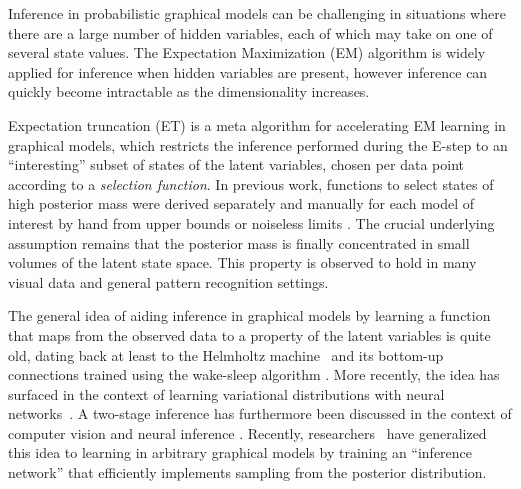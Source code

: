 Inference in probabilistic graphical models can be challenging in situations where
there are a large number of hidden variables, each of which may take on one of several
state values. The Expectation Maximization (EM) algorithm is widely applied for inference when hidden variables
are present, however inference can quickly become intractable as the dimensionality increases.

Expectation truncation (ET) \citep{LuckeEggert2010} is a meta algorithm for accelerating EM learning
in graphical models, which restricts the inference performed during the E-step
to an ``interesting'' subset of states of the latent variables,  %
chosen per data point according to a \emph{selection function}.
In previous work, functions to select states of high posterior mass were 
derived separately and manually for each model of interest by hand from upper bounds or noiseless limits 
\citep{LuckeEggert2010,SheltonEtAl2012,BornscheinEtAl2013,SheikhEtAl2014}.
The crucial underlying assumption remains that the posterior mass is finally concentrated in small volumes of the latent state space.
This property is observed to hold in many visual data and general pattern recognition settings.

The general idea of aiding inference in graphical models by
learning a function that maps from the observed data to
a property of the latent variables is quite old, dating back at least to the
Helmholtz machine~\cite{Dayan95thehelmholtz} and its bottom-up connections trained using the wake-sleep
algorithm \citep{HintonEtAl1995}.
More recently, the idea has surfaced in the context of learning variational distributions with neural networks~\citep{WellingICML2014}.
A two-stage inference has furthermore been discussed in the context of
computer vision \citep{YuilleKersten2006} and neural inference \citep{KoernerEtAl1999}.
Recently, researchers~\citep{MnihGregor2014} %
have generalized this idea to learning in arbitrary graphical models by training
an ``inference network'' that efficiently implements sampling from the posterior
distribution.

